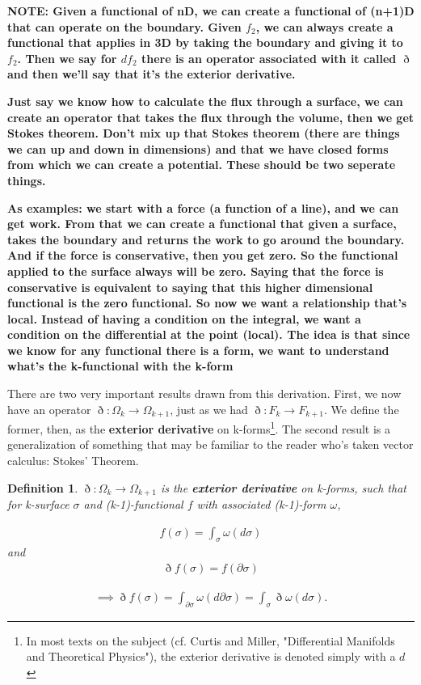 \documentclass{book}
\newtheorem{defn}[equation]{Definition}
\begin{document}
\textbf{NOTE: Given a functional of nD, we can create a functional of (n+1)D that can operate on the boundary. Given $f_2$, we can always create a functional that applies in 3D by taking the boundary and giving it to $f_2$. Then we say for $df_2$ there is an operator associated with it called $\eth$ and then we'll say that it's the exterior derivative. }

\textbf{Just say we know how to calculate the flux through a surface, we can create an operator that takes the flux through the volume, then we get Stokes theorem. Don't mix up that Stokes theorem (there are things we can up and down in dimensions) and that we have closed forms from which we can create a potential. These should be two seperate things.} 

\textbf{As examples: we start with a force (a function of a line), and we can get work. From that we can create a functional that given a surface, takes the boundary and returns the work to go around the boundary. And if the force is conservative, then you get zero. So the functional applied to the surface always will be zero. Saying that the force is conservative is equivalent to saying that this higher dimensional functional is the zero functional. So now we want a relationship that's local. Instead of having a condition on the integral, we want a condition on the differential at the point (local). The idea is that since we know for any functional there is a form, we want to understand what's the k-functional with the k-form}

There are two very important results drawn from this derivation. First, we now have an operator $\eth : \Omega_k \to \Omega_{k+1}$, just as we had $\eth : F_k \to F_{k+1}$. We define the former, then, as the \textbf{exterior derivative} on k-forms\footnote{In most texts on the subject (cf. Curtis and Miller, "Differential Manifolds and Theoretical Physics"), the exterior derivative is denoted simply with a $d$}. The second result is a generalization of something that may be familiar to the reader who's taken vector calculus: Stokes' Theorem. 



\begin{defn}
	$\eth : \Omega_k \to \Omega_{k+1}$ is the \textbf{exterior derivative} on k-forms, such that for k-surface $\sigma$ and (k-1)-functional $f$ with associated (k-1)-form $\omega$, 
	
	\begin{gather}f(\sigma) = \int_{\sigma}\omega(d\sigma)\end{gather} and \begin{gather} \eth f(\sigma) = f(\partial\sigma) \end{gather}
	
	\begin{gather}\implies \eth f(\sigma) = \int_{\partial\sigma} \omega(d\partial\sigma) = \int_{\sigma} \eth\omega(d\sigma).\end{gather} 
\end{defn}
\end{document}
